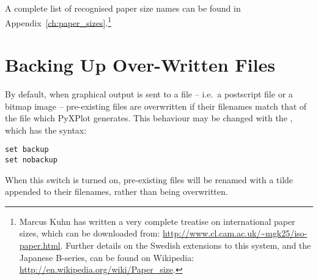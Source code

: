 \noindent A complete list of recognised paper size names can be found in
Appendix~\ref{ch:paper_sizes}.\footnote{Marcus Kuhn has written a very complete
treatise on international paper sizes, which can be downloaded from:
\url{http://www.cl.cam.ac.uk/~mgk25/iso-paper.html}. Further details on the
Swedish extensions to this system, and the Japanese B-series, can be found on
Wikipedia: \url{http://en.wikipedia.org/wiki/Paper_size}.}

\section{Backing Up Over-Written Files}
\label{sec:file_backup}

By default, when graphical output is sent to a file -- i.e.\ a postscript file or
a bitmap image -- pre-existing files are overwritten if their filenames match
that of the file which PyXPlot generates. This behaviour may be changed with
the , which has the syntax:

\begin{verbatim}
set backup
set nobackup
\end{verbatim}

When this switch is turned on, pre-existing files will be renamed with a tilde
appended to their filenames, rather than being overwritten.

